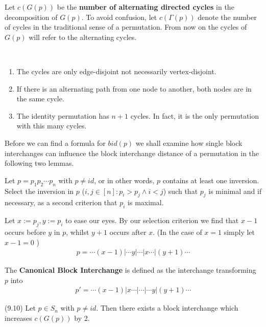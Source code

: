 \begin{definition}
Let $c(G(p))$ be the \textbf{number of alternating directed cycles} in the decomposition of $G(p)$. To avoid confusion, let $c(\Gamma (p))$ denote the number of cycles in the traditional sense of a permutation. From now on the cycles of $G(p)$ will refer to the alternating cycles.
\end{definition}

\begin{remark} ~ %
\begin{enumerate}
\item The cycles are only edge-disjoint not necessarily vertex-disjoint.
\item If there is an alternating path from one node to another, both nodes are in the same cycle.
\item The identity permutation has $n+1$ cycles. In fact, it is the only permutation with this many cycles.
\end{enumerate}
\end{remark}

Before we can find a formula for $bid(p)$ we shall examine how single block interchanges can influence the block interchange distance of a permutation in the following two lemmas.

\begin{definition} Let $p = p_1 p_2 \cdots p_n $ with $ p \neq id $, or in other words, $p$ contains at least one inversion. Select the inversion in $p$ ($ i,j \in [ n ] : p_i > p_j \wedge i < j$) such that $p_j$ is minimal and if necessary, as a second criterion that $p_i$ is maximal. 

Let $x := p_j , y := p_i$ to ease our eyes. By our selection criterion we find that $x-1$ occurs before $y$ in $p$, whilst $y+1$ occurs after $x$. (In the case of $x =1$ simply let $x-1=0$ )
\begin{align*}
p = \cdots (x-1) | \cdots y | \cdots | x \cdots | (y+1) \cdots
\end{align*}

The \textbf{Canonical Block Interchange} is defined as the interchange transforming $p$ into
\begin{align*}
p' = \cdots (x-1) | x \cdots | \cdots | \cdots y | (y+1) \cdots
\end{align*}

\end{definition}

\begin{lemma}
(9.10) Let $p \in S_n$ with $p \neq id$. Then there exists a block interchange which increases $c(G(p))$ by 2.
\end{lemma}

